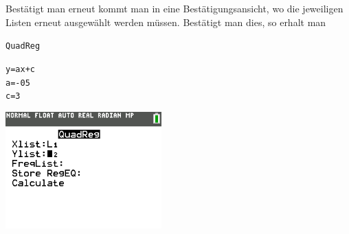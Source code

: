 \begin{paracol}{2}
	\begin{flushleft}
	Bestätigt man erneut kommt man in eine Bestätigungsansicht, wo die jeweiligen Listen erneut ausgewählt werden müssen. Bestätigt man dies, so erhalt man 
	\begin{center}
			\texttt{QuadReg}\\
			\end{center}
			\texttt{y=ax+c}\\
			\texttt{a=-05}\\
			\texttt{c=3}
	\end{flushleft}	
\switchcolumn
	\begin{flushright}
		\includegraphics[width=6cm]{Media/GRT/Visualisierung/Regression/Regression_4.png}
		
	\end{flushright}
\end{paracol}
